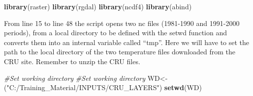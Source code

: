 \documentclass[
  10pt,
  b5paper,
]{book}
\newenvironment{Shaded}{\begin{snugshade}}{\end{snugshade}}
\newcommand{\CommentTok}[1]{\textcolor[rgb]{0.56,0.35,0.01}{\textit{#1}}}
\newcommand{\KeywordTok}[1]{\textcolor[rgb]{0.13,0.29,0.53}{\textbf{#1}}}
\newcommand{\NormalTok}[1]{#1}
\newcommand{\StringTok}[1]{\textcolor[rgb]{0.31,0.60,0.02}{#1}}
\begin{document}
\begin{Shaded}
\begin{Highlighting}[]
\KeywordTok{library}\NormalTok{(raster)}
\KeywordTok{library}\NormalTok{(rgdal)}
\KeywordTok{library}\NormalTok{(ncdf4)}
\KeywordTok{library}\NormalTok{(abind)}
\end{Highlighting}
\end{Shaded}

From line 15 to line 48 the script opens two nc files (1981-1990 and 1991-2000 periods), from a local directory to be defined with the setwd function and converts them into an internal variable called ``tmp''. Here we will have to set the path to the local directory of the two temperature files downloaded from the CRU site. Remember to unzip the CRU files.

\begin{Shaded}
\begin{Highlighting}[]
\CommentTok{#Set working directory}
\CommentTok{#Set working directory}
\NormalTok{WD<-(}\StringTok{"C:/Training_Material/INPUTS/CRU_LAYERS"}\NormalTok{)}
\KeywordTok{setwd}\NormalTok{(WD)}


\end{Highlighting}
\end{Shaded}
\end{document}
